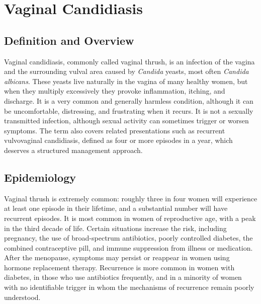 \chapter{Vaginal Candidiasis}

\section*{Definition and Overview}
Vaginal candidiasis, commonly called vaginal thrush, is an infection of the vagina and the surrounding vulval area caused by \textit{Candida} yeasts, most often \textit{Candida albicans}. These yeasts live naturally in the vagina of many healthy women, but when they multiply excessively they provoke inflammation, itching, and discharge. It is a very common and generally harmless condition, although it can be uncomfortable, distressing, and frustrating when it recurs. It is not a sexually transmitted infection, although sexual activity can sometimes trigger or worsen symptoms. The term also covers related presentations such as recurrent vulvovaginal candidiasis, defined as four or more episodes in a year, which deserves a structured management approach.

\section*{Epidemiology}
Vaginal thrush is extremely common: roughly three in four women will experience at least one episode in their lifetime, and a substantial number will have recurrent episodes. It is most common in women of reproductive age, with a peak in the third decade of life. Certain situations increase the risk, including pregnancy, the use of broad-spectrum antibiotics, poorly controlled diabetes, the combined contraceptive pill, and immune suppression from illness or medication. After the menopause, symptoms may persist or reappear in women using hormone replacement therapy. Recurrence is more common in women with diabetes, in those who use antibiotics frequently, and in a minority of women with no identifiable trigger in whom the mechanisms of recurrence remain poorly understood.

